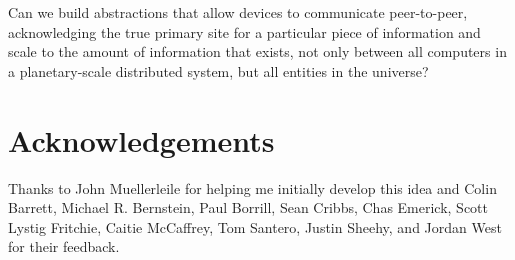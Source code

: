 \documentclass[english]{article}
\begin{document}
Can we build abstractions that allow devices to communicate peer-to-peer, acknowledging the true primary site for a particular piece of information and scale to the amount of information that exists, not only between all computers in a planetary-scale distributed system, but all entities in the universe?

\section*{Acknowledgements}
Thanks to John Muellerleile for helping me initially develop this idea and Colin Barrett, Michael R. Bernstein, Paul Borrill, Sean Cribbs, Chas Emerick, Scott Lystig Fritchie, Caitie McCaffrey, Tom Santero, Justin Sheehy, and Jordan West for their feedback.



\end{document}
